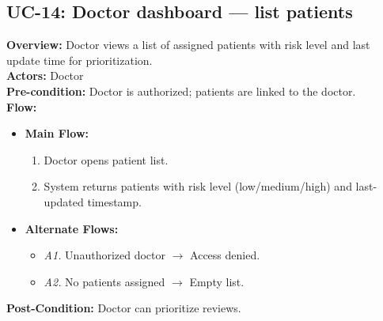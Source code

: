 \documentclass[12pt, a4paper]{article}
\begin{document}
\subsection*{UC-14: Doctor dashboard — list patients}
\textbf{Overview:} Doctor views a list of assigned patients with risk level and last update time for prioritization. \\
\textbf{Actors:} Doctor \\
\textbf{Pre-condition:} Doctor is authorized; patients are linked to the doctor. \\
\textbf{Flow:}
\begin{itemize}[leftmargin=*]
    \item \textbf{Main Flow:}
    \begin{enumerate}
        \item Doctor opens patient list.
        \item System returns patients with risk level (low/medium/high) and last-updated timestamp.
    \end{enumerate}
    \item \textbf{Alternate Flows:}
    \begin{itemize}
        \item \textit{A1.} Unauthorized doctor $\rightarrow$ Access denied.
        \item \textit{A2.} No patients assigned $\rightarrow$ Empty list.
    \end{itemize}
\end{itemize}
\textbf{Post-Condition:} Doctor can prioritize reviews.
\end{document}
